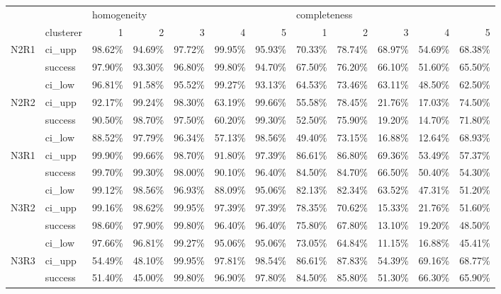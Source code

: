 \begin{tabular}{llrrrrrrrrrr}
\toprule
     & {} & \multicolumn{5}{l}{homogeneity} & \multicolumn{5}{l}{completeness} \\
     & clusterer &           1 &      2 &      3 &      4 &      5 &            1 &      2 &      3 &      4 &      5 \\
\midrule
N2R1 & ci\_upp &      98.62\% & 94.69\% & 97.72\% & 99.95\% & 95.93\% &       70.33\% & 78.74\% & 68.97\% & 54.69\% & 68.38\% \\
     & success &      97.90\% & 93.30\% & 96.80\% & 99.80\% & 94.70\% &       67.50\% & 76.20\% & 66.10\% & 51.60\% & 65.50\% \\
     & ci\_low &      96.81\% & 91.58\% & 95.52\% & 99.27\% & 93.13\% &       64.53\% & 73.46\% & 63.11\% & 48.50\% & 62.50\% \\
N2R2 & ci\_upp &      92.17\% & 99.24\% & 98.30\% & 63.19\% & 99.66\% &       55.58\% & 78.45\% & 21.76\% & 17.03\% & 74.50\% \\
     & success &      90.50\% & 98.70\% & 97.50\% & 60.20\% & 99.30\% &       52.50\% & 75.90\% & 19.20\% & 14.70\% & 71.80\% \\
     & ci\_low &      88.52\% & 97.79\% & 96.34\% & 57.13\% & 98.56\% &       49.40\% & 73.15\% & 16.88\% & 12.64\% & 68.93\% \\
N3R1 & ci\_upp &      99.90\% & 99.66\% & 98.70\% & 91.80\% & 97.39\% &       86.61\% & 86.80\% & 69.36\% & 53.49\% & 57.37\% \\
     & success &      99.70\% & 99.30\% & 98.00\% & 90.10\% & 96.40\% &       84.50\% & 84.70\% & 66.50\% & 50.40\% & 54.30\% \\
     & ci\_low &      99.12\% & 98.56\% & 96.93\% & 88.09\% & 95.06\% &       82.13\% & 82.34\% & 63.52\% & 47.31\% & 51.20\% \\
N3R2 & ci\_upp &      99.16\% & 98.62\% & 99.95\% & 97.39\% & 97.39\% &       78.35\% & 70.62\% & 15.33\% & 21.76\% & 51.60\% \\
     & success &      98.60\% & 97.90\% & 99.80\% & 96.40\% & 96.40\% &       75.80\% & 67.80\% & 13.10\% & 19.20\% & 48.50\% \\
     & ci\_low &      97.66\% & 96.81\% & 99.27\% & 95.06\% & 95.06\% &       73.05\% & 64.84\% & 11.15\% & 16.88\% & 45.41\% \\
N3R3 & ci\_upp &      54.49\% & 48.10\% & 99.95\% & 97.81\% & 98.54\% &       86.61\% & 87.83\% & 54.39\% & 69.16\% & 68.77\% \\
     & success &      51.40\% & 45.00\% & 99.80\% & 96.90\% & 97.80\% &       84.50\% & 85.80\% & 51.30\% & 66.30\% & 65.90\% \\

\end{tabular}
